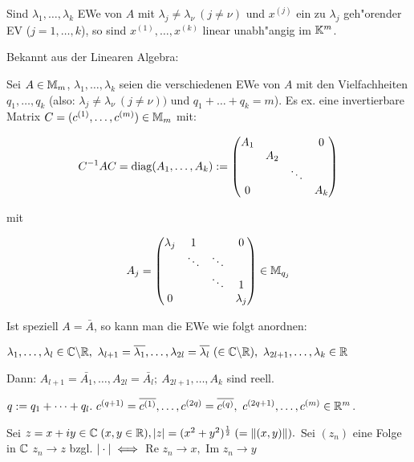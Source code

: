 \documentclass{article}
\begin{document}
Sind $\lambda_1,\ldots,\lambda_k$ EWe von $A$ mit $\lambda_j\ne\lambda_\nu\ (j\ne\nu)$ und $x^{(j)}$ ein zu $\lambda_j$ geh"orender EV ($j=1,\ldots,k$), so sind $x^{(1)},\ldots,x^{(k)}$ linear unabh"angig im $\mathbb{K}^m$.

Bekannt aus der Linearen Algebra:

\begin{satz}
Sei $A\in\mathbb{M}_m$, $\lambda_1,\ldots,\lambda_k$ seien die verschiedenen EWe von $A$ mit den Vielfachheiten $q_1,\ldots,q_k$ (also: $\lambda_j \ne \lambda_\nu\ (j\ne\nu))$ und $q_1+\ldots+q_k = m$). Es ex. eine invertierbare Matrix $C=(c^{(1)},\ldots,c^{(m)})\in\mathbb{M}_m$ mit:

$$C^{-1}AC = \mathop{\rm diag}\nolimits(A_1,\ldots,A_k) := \begin{pmatrix}
A_1 &     &        & 0\\
    & A_2 &        &\\
    &     & \ddots &\\
0   &     &        & A_k
\end{pmatrix}$$

mit 

$$A_j = \begin{pmatrix}
\lambda_j & 1 & & 0\\
   & \ddots & \ddots &\\
   &        & \ddots & 1\\
 0 &        &        & \lambda_j
\end{pmatrix} \in \mathbb{M}_{q_j}$$
\end{satz}

Ist speziell $A=\bar{A}$, so kann man die EWe wie folgt anordnen:

$\lambda_1,\ldots,\lambda_l\in\MdC\backslash\MdR,\ \lambda_{l+1} = \overline{\lambda_1},\ldots,\lambda_{2l} = \overline{\lambda_l}\ (\in\MdC\backslash\MdR),\ \lambda_{2l+1},\ldots,\lambda_k\in\MdR$

Dann: $A_{l+1} = \bar{A_1},\ldots,A_{2l}=\bar{A_l};\ A_{2l+1},\ldots,A_k$ sind reell.

$q:=q_1+\cdots+q_l.\ c^{(q+1)} = \overline{c^{(1)}},\ldots,c^{(2q)} = \overline{c^{(q)}},\ c^{(2q+1)},\ldots,c^{(m)}\in\MdR^m$.

\begin{definition}
Sei $z = x + iy \in \mathbb{C} \; (x, y \in \mathbb{R}), |z| = (x^2 + y^2)^\frac{1}{2} \; (= \|(x,y)\|).$ Sei $(z_n)$ eine Folge in $\mathbb{C}$ $z_n \rightarrow z$ bzgl. $|\cdot| \iff$ Re $z_n \rightarrow x,$ Im $z_n \rightarrow y$
\end{definition}
\end{document}
